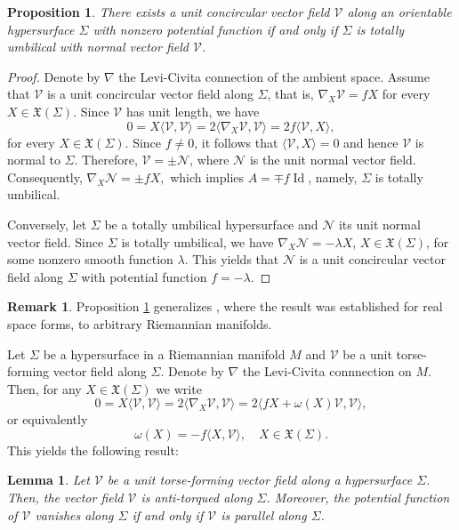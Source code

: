 \documentclass[12pt,reqno]{amsart}
\def\v{\mathcal V}
\def\n{\mathcal N}
\def\x{\mathfrak X}
\newtheorem{proposition}[theorem]{Proposition}
\newtheorem{lemma}[theorem]{Lemma}
\theoremstyle{definition}
\newtheorem{remark}[theorem]{Remark}
\begin{document}
\begin{proposition}\label{p-umb}
There exists a unit concircular vector field $\v$ along an orientable hypersurface $\Sigma$ with nonzero potential function if and only if $\Sigma$ is totally umbilical with normal vector field $\v$.
\end{proposition}
\begin{proof}
Denote by $\nabla$ the Levi-Civita connection of the ambient space. Assume that $\v$ is a unit concircular vector field along $\Sigma$, that is, $\nabla_X \v = f X$ for every $X\in \x(\Sigma)$. Since $\v$ has unit length, we have
$$
0=X\langle \v, \v \rangle = 2\langle \nabla_X \v, \v\rangle = 2f \langle \v, X \rangle,
$$
for every $X\in \x(\Sigma)$. Since $f \neq 0$, it follows that $\langle \v, X \rangle = 0$ and hence $\v$ is normal to $\Sigma$. Therefore, $\v = \pm \n$, where $\n$ is the unit normal vector field. Consequently, $\nabla_X \n =\pm f X,$ which implies $A = \mp f \operatorname{Id}$, namely, $\Sigma$ is totally umbilical.

Conversely, let $\Sigma$ be a totally umbilical hypersurface and $\n$ its unit normal vector field. Since $\Sigma$ is totally umbilical, we have $\nabla_X\n=-\lambda X$,  $X\in \x(\Sigma)$, for some nonzero smooth function $\lambda$. This yields that $\n$ is a unit concircular vector field along $\Sigma$ with potential function $f=-\lambda$. 
\end{proof}

\begin{remark}
Proposition \ref{p-umb} generalizes \cite[Proposition 4]{loy5}, where the result was established for real space forms, to arbitrary Riemannian manifolds.
\end{remark}

Let $\Sigma$ be a  hypersurface in a Riemannian manifold $M$ and $\v$ be a unit torse-forming vector field along $\Sigma$. Denote by $\nabla$ the Levi-Civita connnection on $M$. Then, for any $X\in \x(\Sigma)$ we write
$$
0=X\langle \v, \v \rangle = 2\langle \nabla_X \v, \v\rangle = 2 \langle fX+\omega(X)\v, \v \rangle,
$$
or equivalently 
\begin{equation}\label{omega}
\omega(X)=-f\langle X, \v \rangle, \quad X\in \x(\Sigma).
\end{equation}
This yields the following result:

\begin{lemma}\label{l-par}
Let $\v$ be a unit torse-forming vector field along a hypersurface $\Sigma$. Then, the vector field $\v$ is anti-torqued along $\Sigma$. Moreover, the potential function of $\v$ vanishes along $\Sigma$ if and only if $\v$ is parallel along $\Sigma$.
\end{lemma}
\end{document}
